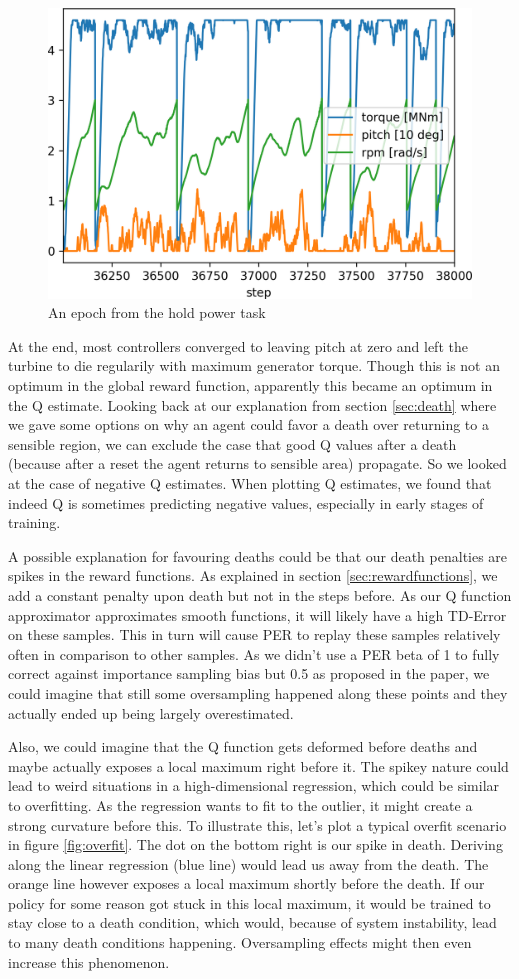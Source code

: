 \documentclass[hyperref,beleg]{cgvpub}
\begin{document}
\begin{figure}
  \centering
  \includegraphics[width=0.5\linewidth]{images/crashing_turbines.png}
  \caption{An epoch from the hold power task}
  \label{fig:crashing_turbines}
\end{figure}

At the end, most controllers converged to leaving pitch at zero and left the turbine to die regularily with maximum generator torque. Though this is not an optimum in the global reward function, apparently this became an optimum in the Q estimate. Looking back at our explanation from section \ref{sec:death} where we gave some options on why an agent could favor a death over returning to a sensible region, we can exclude the case that good Q values after a death (because after a reset the agent returns to sensible area) propagate. So we looked at the case of negative Q estimates. When plotting Q estimates, we found that indeed Q is sometimes predicting negative values, especially in early stages of training.

A possible explanation for favouring deaths could be that our death penalties are spikes in the reward functions. As explained in section \ref{sec:rewardfunctions}, we add a constant penalty upon death but not in the steps before. As our Q function approximator approximates smooth functions, it will likely have a high TD-Error on these samples. This in turn will cause \ac{PER} to replay these samples relatively often in comparison to other samples. As we didn't use a \ac{PER} beta of 1 to fully correct against importance sampling bias but 0.5 as proposed in the paper, we could imagine that still some oversampling happened along these points and they actually ended up being largely overestimated.

Also, we could imagine that the Q function gets deformed before deaths and maybe actually exposes a local maximum right before it. The spikey nature could lead to weird situations in a high-dimensional regression, which could be similar to overfitting. As the regression wants to fit to the outlier, it might create a strong curvature before this. To illustrate this, let's plot a typical overfit scenario in figure \ref{fig:overfit}. The dot on the bottom right is our spike in death. Deriving along the linear regression (blue line) would lead us away from the death. The orange line however exposes a local maximum shortly before the death. If our policy for some reason got stuck in this local maximum, it would be trained to stay close to a death condition, which would, because of system instability, lead to many death conditions happening. Oversampling effects might then even increase this phenomenon.
\end{document}
